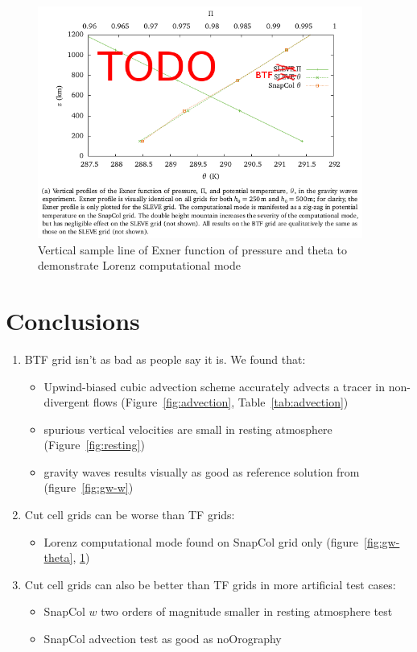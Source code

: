 \documentclass[a4paper]{article}
\begin{document}
\begin{figure}
	\includegraphics[height=3in]{gw-exner-theta.png}
%
	\caption{Vertical sample line of Exner function of pressure and theta to demonstrate Lorenz computational mode}
	\label{fig:gw-exner-theta}
\end{figure}


\section{Conclusions}
\begin{enumerate}
	\item BTF grid isn't as bad as people say it is.  We found that:
	\begin{itemize}
		\item Upwind-biased cubic advection scheme accurately advects a tracer in non-divergent flows (Figure~\ref{fig:advection}, Table~\ref{tab:advection})
		\item spurious vertical velocities are small in resting atmosphere (Figure~\ref{fig:resting})
		\item gravity waves results visually as good as reference solution from \textcite{melvin2010} (figure~\ref{fig:gw-w})
	\end{itemize}

	\item Cut cell grids can be worse than TF grids:
	\begin{itemize}
		\item Lorenz computational mode found on SnapCol grid only (figure~\ref{fig:gw-theta}, \ref{fig:gw-exner-theta})
	\end{itemize}

	\item Cut cell grids can also be better than TF grids in more artificial test cases:
	\begin{itemize}
		\item SnapCol $w$ two orders of magnitude smaller in resting atmosphere test
		\item SnapCol advection test as good as noOrography
	\end{itemize}
\end{enumerate}
\end{document}

